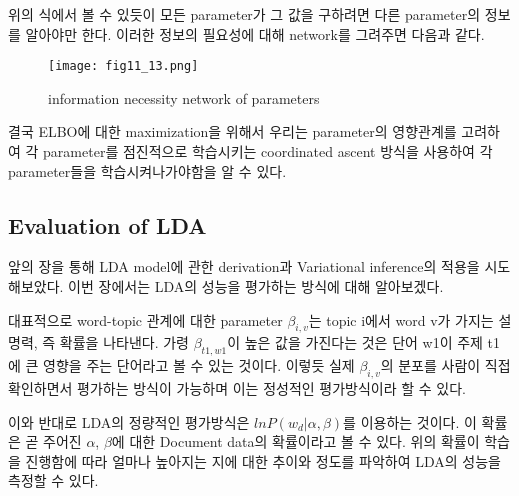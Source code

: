\documentclass[draft=false]{oblivoir}
\begin{document}
위의 식에서 볼 수 있듯이 모든 parameter가 그 값을 구하려면 다른 parameter의 정보를 알아야만 한다. 이러한 정보의 필요성에 대해 network를 그려주면 다음과 같다.

\begin{figure}[ht] \centering 
\texttt{[image: fig11\_13.png]} 
\caption{information necessity network of parameters}
\label{fig:11-15}
\end{figure}

결국 ELBO에 대한 maximization을 위해서 우리는 parameter의 영향관계를 고려하여 각 parameter를 점진적으로 학습시키는 coordinated ascent 방식을 사용하여 각 parameter들을 학습시켜나가야함을 알 수 있다.


\subsection{Evaluation of LDA}
앞의 장을 통해 LDA model에 관한 derivation과 Variational inference의 적용을 시도해보았다. 이번 장에서는 LDA의 성능을 평가하는 방식에 대해 알아보겠다. 

대표적으로 word-topic 관계에 대한 parameter $\beta_{i,v}$는 topic i에서 word v가 가지는 설명력, 즉 확률을 나타낸다. 가령 $\beta_{t1,w1}$이 높은 값을 가진다는 것은 단어 w1이 주제 t1에 큰 영향을 주는 단어라고 볼 수 있는 것이다. 이렇듯 실제 $\beta_{i,v}$의 분포를 사람이 직접 확인하면서 평가하는 방식이 가능하며 이는 정성적인 평가방식이라 할 수 있다. 

이와 반대로 LDA의 정량적인 평가방식은 $lnP(w_{d}|\alpha,\beta)$를 이용하는 것이다. 이 확률은 곧 주어진 $\alpha$, $\beta$에 대한 Document data의 확률이라고 볼 수 있다. 위의 확률이 학습을 진행함에 따라 얼마나 높아지는 지에 대한 추이와 정도를 파악하여 LDA의 성능을 측정할 수 있다.
\end{document}
